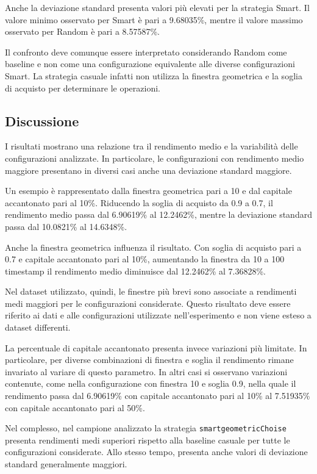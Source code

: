 \documentclass[a4paper,oneside,italian]{sapthesis}
\begin{document}
Anche la deviazione standard presenta valori più elevati per la strategia
Smart. Il valore minimo osservato per Smart è pari a 9.68035\%, mentre il
valore massimo osservato per Random è pari a 8.57587\%.

Il confronto deve comunque essere interpretato considerando Random come
baseline e non come una configurazione equivalente alle diverse
configurazioni Smart. La strategia casuale infatti non utilizza la finestra
geometrica e la soglia di acquisto per determinare le operazioni.

\subsection{Discussione}

I risultati mostrano una relazione tra il rendimento medio e la variabilità
delle configurazioni analizzate. In particolare, le configurazioni con
rendimento medio maggiore presentano in diversi casi anche una deviazione
standard maggiore.

Un esempio è rappresentato dalla finestra geometrica pari a 10 e dal
capitale accantonato pari al 10\%. Riducendo la soglia di acquisto da 0.9 a
0.7, il rendimento medio passa dal 6.90619\% al 12.2462\%, mentre la
deviazione standard passa dal 10.0821\% al 14.6348\%.

Anche la finestra geometrica influenza il risultato. Con soglia di acquisto
pari a 0.7 e capitale accantonato pari al 10\%, aumentando la finestra da 10
a 100 timestamp il rendimento medio diminuisce dal 12.2462\% al 7.36828\%.

Nel dataset utilizzato, quindi, le finestre più brevi sono associate a
rendimenti medi maggiori per le configurazioni considerate. Questo risultato
deve essere riferito ai dati e alle configurazioni utilizzate nell'esperimento
e non viene esteso a dataset differenti.

La percentuale di capitale accantonato presenta invece variazioni più
limitate. In particolare, per diverse combinazioni di finestra e soglia il
rendimento rimane invariato al variare di questo parametro. In altri casi si
osservano variazioni contenute, come nella configurazione con finestra 10 e
soglia 0.9, nella quale il rendimento passa dal 6.90619\% con capitale
accantonato pari al 10\% al 7.51935\% con capitale accantonato pari al 50\%.

Nel complesso, nel campione analizzato la strategia
\texttt{smartgeometricChoise} presenta rendimenti medi superiori rispetto
alla baseline casuale per tutte le configurazioni considerate. Allo stesso
tempo, presenta anche valori di deviazione standard generalmente maggiori.
\end{document}
